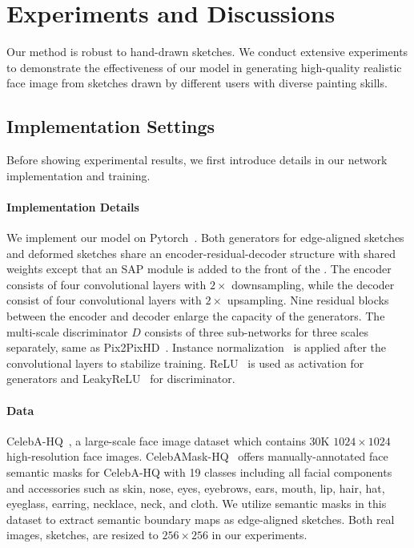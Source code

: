 \section{Experiments and Discussions}
\label{sec:experiments}

Our method is robust to hand-drawn sketches. We conduct extensive experiments to demonstrate the effectiveness of our model in generating high-quality realistic face image from sketches drawn by different users with diverse painting skills.  


\subsection{Implementation Settings}
Before showing experimental results, we first introduce details in our network implementation and training. 


\paragraph{Implementation Details}
We implement our model on Pytorch~\cite{Pytorch}. Both generators for edge-aligned sketches and deformed sketches share an encoder-residual-decoder structure with shared weights except that an SAP module is added to the front of the . 
The encoder consists of four convolutional layers with $2\times$ downsampling, while the decoder consist of four convolutional layers with $2\times$ upsampling. 
Nine residual blocks between the encoder and decoder enlarge the capacity of the generators. 
The multi-scale discriminator $D$ consists of three sub-networks for three scales separately, same as Pix2PixHD~\cite{pix2pixHD}. 
Instance normalization~\cite{IN} is applied after the convolutional layers to stabilize training. 
ReLU~\cite{ReLU} is used as activation for generators and LeakyReLU~\cite{LeakyReLU} for discriminator. 
%
\paragraph{Data}
CelebA-HQ~\cite{PGGAN}, a large-scale face image dataset which contains 30K $1024\times1024$ high-resolution face images. 
%
CelebAMask-HQ~\cite{CelebAMask-HQ} offers manually-annotated face semantic masks for CelebA-HQ with 19 classes including all facial components and accessories such as skin, nose, eyes, eyebrows, ears, mouth, lip, hair, hat, eyeglass, earring, necklace, neck, and cloth. We utilize semantic masks in this dataset to extract semantic boundary maps as edge-aligned sketches. 
Both real images, sketches,  are resized to $256\times256$ in our experiments.


